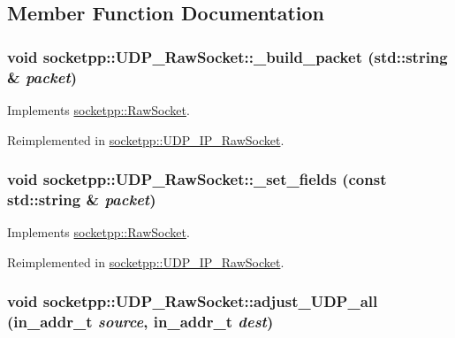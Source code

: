 \subsection{Member Function Documentation}
\hypertarget{classsocketpp_1_1UDP__RawSocket_fe8cc7391c23dcf011f285b1605cad6b}{
\subsubsection[{\_\-build\_\-packet}]{\setlength{\rightskip}{0pt plus 5cm}void socketpp::UDP\_\-RawSocket::\_\-build\_\-packet (std::string \& {\em packet})}}
\label{classsocketpp_1_1UDP__RawSocket_fe8cc7391c23dcf011f285b1605cad6b}




Implements \hyperlink{classsocketpp_1_1RawSocket_eb0a3f716c0fc46efa4123acf0fe1e66}{socketpp::RawSocket}.

Reimplemented in \hyperlink{classsocketpp_1_1UDP__IP__RawSocket_16035f1b701b898f0e4de44a9ac8bbb3}{socketpp::UDP\_\-IP\_\-RawSocket}.\hypertarget{classsocketpp_1_1UDP__RawSocket_a2dd7ab190a6730f9272eced4e648b50}{
\subsubsection[{\_\-set\_\-fields}]{\setlength{\rightskip}{0pt plus 5cm}void socketpp::UDP\_\-RawSocket::\_\-set\_\-fields (const std::string \& {\em packet})}}
\label{classsocketpp_1_1UDP__RawSocket_a2dd7ab190a6730f9272eced4e648b50}




Implements \hyperlink{classsocketpp_1_1RawSocket_45e6b041703cb8ae0f93dd19766865d5}{socketpp::RawSocket}.

Reimplemented in \hyperlink{classsocketpp_1_1UDP__IP__RawSocket_40fde867fa138b495f660864023a3eb1}{socketpp::UDP\_\-IP\_\-RawSocket}.\hypertarget{classsocketpp_1_1UDP__RawSocket_4fe2e6b184ca8f8248a187df30e12fd2}{
\subsubsection[{adjust\_\-UDP\_\-all}]{\setlength{\rightskip}{0pt plus 5cm}void socketpp::UDP\_\-RawSocket::adjust\_\-UDP\_\-all (in\_\-addr\_\-t {\em source}, \/  in\_\-addr\_\-t {\em dest})}}
\label{classsocketpp_1_1UDP__RawSocket_4fe2e6b184ca8f8248a187df30e12fd2}


